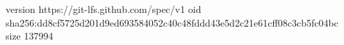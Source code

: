 version https://git-lfs.github.com/spec/v1
oid sha256:dd8cf5725d201d9ed693584052c40c48fddd43e5d2c21e61cff08c3cb5fc04bc
size 137994
